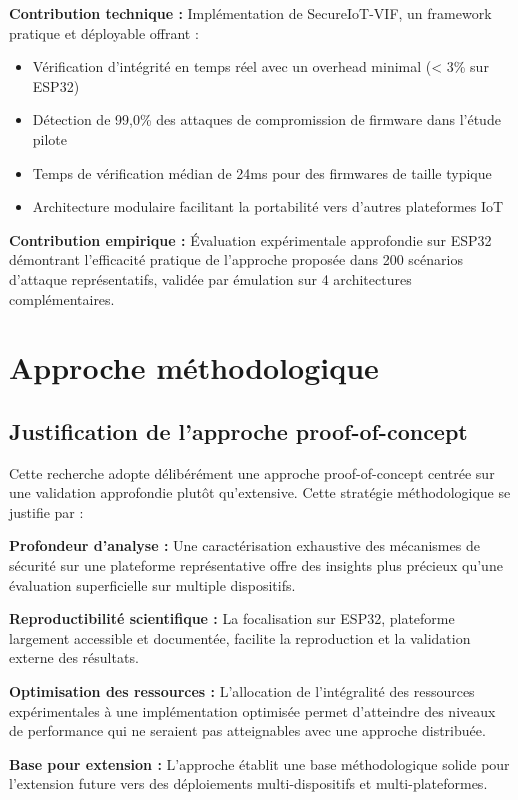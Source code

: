 \textbf{Contribution technique :} Implémentation de SecureIoT-VIF, un framework pratique et déployable offrant :
\begin{itemize}
    \item Vérification d'intégrité en temps réel avec un overhead minimal (< 3\% sur ESP32)
    \item Détection de 99,0\% des attaques de compromission de firmware dans l'étude pilote
    \item Temps de vérification médian de 24ms pour des firmwares de taille typique
    \item Architecture modulaire facilitant la portabilité vers d'autres plateformes IoT
\end{itemize}

\textbf{Contribution empirique :} Évaluation expérimentale approfondie sur ESP32 démontrant l'efficacité pratique de l'approche proposée dans 200 scénarios d'attaque représentatifs, validée par émulation sur 4 architectures complémentaires.

\section{Approche méthodologique}

\subsection{Justification de l'approche proof-of-concept}

Cette recherche adopte délibérément une approche proof-of-concept centrée sur une validation approfondie plutôt qu'extensive. Cette stratégie méthodologique se justifie par :

\textbf{Profondeur d'analyse :} Une caractérisation exhaustive des mécanismes de sécurité sur une plateforme représentative offre des insights plus précieux qu'une évaluation superficielle sur multiple dispositifs.

\textbf{Reproductibilité scientifique :} La focalisation sur ESP32, plateforme largement accessible et documentée, facilite la reproduction et la validation externe des résultats.

\textbf{Optimisation des ressources :} L'allocation de l'intégralité des ressources expérimentales à une implémentation optimisée permet d'atteindre des niveaux de performance qui ne seraient pas atteignables avec une approche distribuée.

\textbf{Base pour extension :} L'approche établit une base méthodologique solide pour l'extension future vers des déploiements multi-dispositifs et multi-plateformes.

